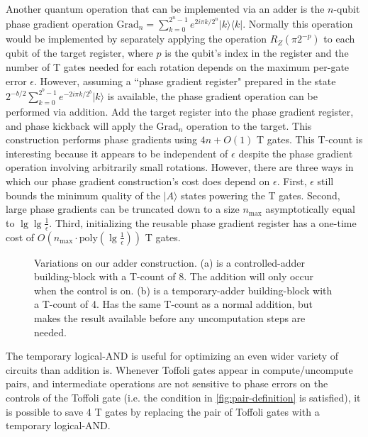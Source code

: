 \documentclass[twocolumn]{revtex4-1}
\begin{document}
Another quantum operation that can be implemented via an adder is the $n$-qubit phase gradient operation $\text{Grad}_n = \sum_{k=0}^{2^n-1} e^{2 i \pi k / 2^n} |k\rangle \langle k|$.
Normally this operation would be implemented by separately applying the operation $R_Z(\pi 2^{-p})$ to each qubit of the target register, where $p$ is the qubit's index in the register and the number of T gates needed for each rotation depends on the maximum per-gate error $\epsilon$.
However, assuming a ``phase gradient register" prepared in the state $2^{-b/2} \sum_{k=0}^{2^b-1} e^{-2 i \pi k / 2^b} |k\rangle$ is available, the phase gradient operation can be performed via addition.
Add the target register into the phase gradient register, and phase kickback will apply the $\text{Grad}_n$ operation to the target.
This construction performs phase gradients using $4n + O(1)$ T gates.
This T-count is interesting because it appears to be independent of $\epsilon$ despite the phase gradient operation involving arbitrarily small rotations.
However, there are three ways in which our phase gradient construction's cost does depend on $\epsilon$.
First, $\epsilon$ still bounds the minimum quality of the $|A\rangle$ states powering the T gates.
Second, large phase gradients can be truncated down to a size $n_{\text{max}}$ asymptotically equal to $\lg \lg \frac{1}{\epsilon}$.
Third, initializing the reusable phase gradient register has a one-time cost of $O(n_{\text{max}} \cdot \text{poly}(\lg \frac{1}{\epsilon}))$ T gates.


\begin{figure}
  
  \caption{
	Variations on our adder construction.
	(a) is a controlled-adder building-block with a T-count of 8.
	The addition will only occur when the control is on.
	(b) is a temporary-adder building-block with a T-count of 4.
	Has the same T-count as a normal addition, but makes the result available before any uncomputation steps are needed.
  }
  \label{fig:variations-on-full-adder-block}
\end{figure}

The temporary logical-AND is useful for optimizing an even wider variety of circuits than addition is.
Whenever Toffoli gates appear in compute/uncompute pairs, and intermediate operations are not sensitive to phase errors on the controls of the Toffoli gate (i.e. the condition in \autoref{fig:pair-definition} is satisfied), it is possible to save 4 T gates by replacing the pair of Toffoli gates with a temporary logical-AND.
\end{document}

